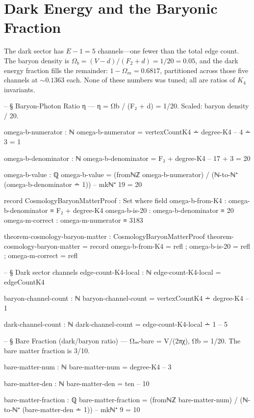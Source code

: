 \documentclass[11pt,a4paper]{book}
\begin{document}
\section{Dark Energy and the Baryonic Fraction}

The dark sector has $E - 1 = 5$ channels---one fewer than the total edge count. The baryon density is $\Omega_b = (V - d)/(F_2 + d) = 1/20 = 0.05$, and the dark energy fraction fills the remainder: $1 - \Omega_m = 0.6817$, partitioned across those five channels at $\sim 0.1363$ each. None of these numbers was tuned; all are ratios of $K_4$ invariants.

\begin{code}
-- § Baryon-Photon Ratio η — η = Ωb / (F₂ + d) = 1/20. Scaled: baryon density / 20.

omega-b-numerator : ℕ
omega-b-numerator = vertexCountK4 ∸ degree-K4  -- 4 ∸ 3 = 1

omega-b-denominator : ℕ
omega-b-denominator = F₂ + degree-K4  -- 17 + 3 = 20

omega-b-value : ℚ
omega-b-value = (fromℕℤ omega-b-numerator) / (ℕ-to-ℕ⁺ (omega-b-denominator ∸ 1))  -- mkℕ⁺ 19 = 20

record CosmologyBaryonMatterProof : Set where
  field
    omega-b-from-K4 : omega-b-denominator ≡ F₂ + degree-K4
    omega-b-is-20 : omega-b-denominator ≡ 20
    omega-m-correct : omega-m-numerator ≡ 3183

theorem-cosmology-baryon-matter : CosmologyBaryonMatterProof
theorem-cosmology-baryon-matter = record
  { omega-b-from-K4 = refl
  ; omega-b-is-20 = refl
  ; omega-m-correct = refl }

-- § Dark sector channels
edge-count-K4-local : ℕ
edge-count-K4-local = edgeCountK4

baryon-channel-count : ℕ
baryon-channel-count = vertexCountK4 ∸ degree-K4  -- 1

dark-channel-count : ℕ
dark-channel-count = edge-count-K4-local ∸ 1  -- 5

-- § Bare Fraction (dark/baryon ratio) — Ωₘ-bare = V/(2πχ), Ωb = 1/20. The bare matter fraction is 3/10.

bare-matter-num : ℕ
bare-matter-num = degree-K4  -- 3

bare-matter-den : ℕ
bare-matter-den = ten  -- 10

bare-matter-fraction : ℚ
bare-matter-fraction = (fromℕℤ bare-matter-num) / (ℕ-to-ℕ⁺ (bare-matter-den ∸ 1))  -- mkℕ⁺ 9 = 10
\end{code}

\end{document}
